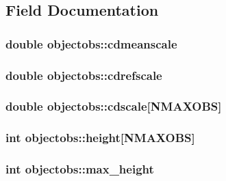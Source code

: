 \subsection{Field Documentation}
\hypertarget{structobjectobs_a1506d3b4117e2c7681e896c75a83e7b4}{
\subsubsection[{cdmeanscale}]{\setlength{\rightskip}{0pt plus 5cm}double {\bf objectobs::cdmeanscale}}}
\label{structobjectobs_a1506d3b4117e2c7681e896c75a83e7b4}
\hypertarget{structobjectobs_a8eb527e1304fb90ac417cd12bdec67ae}{
\subsubsection[{cdrefscale}]{\setlength{\rightskip}{0pt plus 5cm}double {\bf objectobs::cdrefscale}}}
\label{structobjectobs_a8eb527e1304fb90ac417cd12bdec67ae}
\hypertarget{structobjectobs_aa80cb10d92102ffc461b05d221b6d5e1}{
\subsubsection[{cdscale}]{\setlength{\rightskip}{0pt plus 5cm}double {\bf objectobs::cdscale}\mbox{[}NMAXOBS\mbox{]}}}
\label{structobjectobs_aa80cb10d92102ffc461b05d221b6d5e1}
\hypertarget{structobjectobs_ae0f18cbcb1718ff870d3ca7de30c40ba}{
\subsubsection[{height}]{\setlength{\rightskip}{0pt plus 5cm}int {\bf objectobs::height}\mbox{[}NMAXOBS\mbox{]}}}
\label{structobjectobs_ae0f18cbcb1718ff870d3ca7de30c40ba}
\hypertarget{structobjectobs_ad37101c4854d55729abfdab899945ea4}{
\subsubsection[{max\_\-height}]{\setlength{\rightskip}{0pt plus 5cm}int {\bf objectobs::max\_\-height}}}
